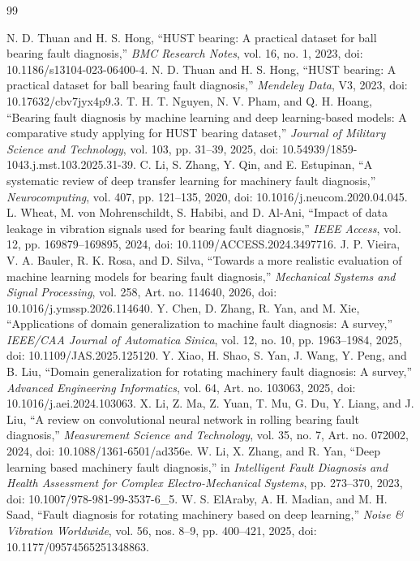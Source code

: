 \documentclass[machines,article,submit,oneauthor,pdftex]{Definitions/mdpi}
\begin{document}
\begin{thebibliography}{99}

 N. D. Thuan and H. S. Hong, ``HUST bearing: A practical dataset for ball bearing fault diagnosis,'' \emph{BMC Research Notes}, vol. 16, no. 1, 2023, doi: 10.1186/s13104-023-06400-4.
 N. D. Thuan and H. S. Hong, ``HUST bearing: A practical dataset for ball bearing fault diagnosis,'' \emph{Mendeley Data}, V3, 2023, doi: 10.17632/cbv7jyx4p9.3.
 T. H. T. Nguyen, N. V. Pham, and Q. H. Hoang, ``Bearing fault diagnosis by machine learning and deep learning-based models: A comparative study applying for HUST bearing dataset,'' \emph{Journal of Military Science and Technology}, vol. 103, pp. 31--39, 2025, doi: 10.54939/1859-1043.j.mst.103.2025.31-39.
 C. Li, S. Zhang, Y. Qin, and E. Estupinan, ``A systematic review of deep transfer learning for machinery fault diagnosis,'' \emph{Neurocomputing}, vol. 407, pp. 121--135, 2020, doi: 10.1016/j.neucom.2020.04.045.
 L. Wheat, M. von Mohrenschildt, S. Habibi, and D. Al-Ani, ``Impact of data leakage in vibration signals used for bearing fault diagnosis,'' \emph{IEEE Access}, vol. 12, pp. 169879--169895, 2024, doi: 10.1109/ACCESS.2024.3497716.
 J. P. Vieira, V. A. Bauler, R. K. Rosa, and D. Silva, ``Towards a more realistic evaluation of machine learning models for bearing fault diagnosis,'' \emph{Mechanical Systems and Signal Processing}, vol. 258, Art. no. 114640, 2026, doi: 10.1016/j.ymssp.2026.114640.
 Y. Chen, D. Zhang, R. Yan, and M. Xie, ``Applications of domain generalization to machine fault diagnosis: A survey,'' \emph{IEEE/CAA Journal of Automatica Sinica}, vol. 12, no. 10, pp. 1963--1984, 2025, doi: 10.1109/JAS.2025.125120.
 Y. Xiao, H. Shao, S. Yan, J. Wang, Y. Peng, and B. Liu, ``Domain generalization for rotating machinery fault diagnosis: A survey,'' \emph{Advanced Engineering Informatics}, vol. 64, Art. no. 103063, 2025, doi: 10.1016/j.aei.2024.103063.
 X. Li, Z. Ma, Z. Yuan, T. Mu, G. Du, Y. Liang, and J. Liu, ``A review on convolutional neural network in rolling bearing fault diagnosis,'' \emph{Measurement Science and Technology}, vol. 35, no. 7, Art. no. 072002, 2024, doi: 10.1088/1361-6501/ad356e.
 W. Li, X. Zhang, and R. Yan, ``Deep learning based machinery fault diagnosis,'' in \emph{Intelligent Fault Diagnosis and Health Assessment for Complex Electro-Mechanical Systems}, pp. 273--370, 2023, doi: 10.1007/978-981-99-3537-6\_5.
 W. S. ElAraby, A. H. Madian, and M. H. Saad, ``Fault diagnosis for rotating machinery based on deep learning,'' \emph{Noise \& Vibration Worldwide}, vol. 56, nos. 8--9, pp. 400--421, 2025, doi: 10.1177/09574565251348863.

\end{thebibliography}
\end{document}
